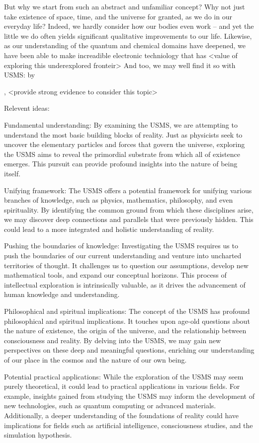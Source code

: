 But why we start from such an abstract and unfamiliar concept? Why not just take existence of space, time, and the universe for granted, as we do in our everyday life? Indeed, we hardly consider how our bodies even work -- and yet the little we do often yields significant qualitative improvements to our life. Likewise, as our understanding of the quantum and chemical domains have deepened, we have been able to make increadible electronic techniology that has <value of exploring this underexplored fronteir> And too, we may well find it so with USMS: by

, <provide strong evidence to consider this topic>

Relevent ideas:

Fundamental understanding: By examining the USMS, we are attempting to understand the most basic building blocks of reality. Just as physicists seek to uncover the elementary particles and forces that govern the universe, exploring the USMS aims to reveal the primordial substrate from which all of existence emerges. This pursuit can provide profound insights into the nature of being itself.

Unifying framework: The USMS offers a potential framework for unifying various branches of knowledge, such as physics, mathematics, philosophy, and even spirituality. By identifying the common ground from which these disciplines arise, we may discover deep connections and parallels that were previously hidden. This could lead to a more integrated and holistic understanding of reality.

Pushing the boundaries of knowledge: Investigating the USMS requires us to push the boundaries of our current understanding and venture into uncharted territories of thought. It challenges us to question our assumptions, develop new mathematical tools, and expand our conceptual horizons. This process of intellectual exploration is intrinsically valuable, as it drives the advancement of human knowledge and understanding.

Philosophical and spiritual implications: The concept of the USMS has profound philosophical and spiritual implications. It touches upon age-old questions about the nature of existence, the origin of the universe, and the relationship between consciousness and reality. By delving into the USMS, we may gain new perspectives on these deep and meaningful questions, enriching our understanding of our place in the cosmos and the nature of our own being.

Potential practical applications: While the exploration of the USMS may seem purely theoretical, it could lead to practical applications in various fields. For example, insights gained from studying the USMS may inform the development of new technologies, such as quantum computing or advanced materials. Additionally, a deeper understanding of the foundations of reality could have implications for fields such as artificial intelligence, consciousness studies, and the simulation hypothesis.


